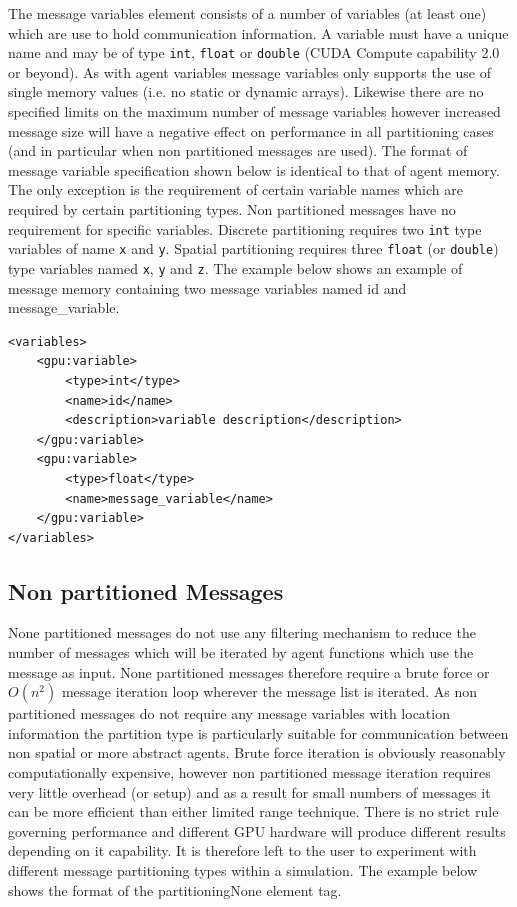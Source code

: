 \documentclass[11pt, a4paper, onecolumn, oneside]{report}
\begin{document}
The message variables element consists of a number of variables (at least one) which are use to hold communication information.
A variable must have a unique name and may be of type \texttt{int}, \texttt{float} or \texttt{double} (CUDA Compute capability 2.0 or beyond).
As with agent variables message variables only supports the use of single memory values (i.e. no static or dynamic arrays).
Likewise there are no specified limits on the maximum number of message variables however increased message size will have a negative effect on performance in all partitioning cases (and in particular when non partitioned messages are used).
The format of message variable specification shown below is identical to that of agent memory.
The only exception is the requirement of certain variable names which are required by certain partitioning types.
Non partitioned messages have no requirement for specific variables.
Discrete partitioning requires two \texttt{int} type variables of name \texttt{x} and \texttt{y}.
Spatial partitioning requires three \texttt{float} (or \texttt{double}) type variables named \texttt{x}, \texttt{y} and \texttt{z}.
The example below shows an example of message memory containing two message variables named id and message\_variable.


\begin{verbatim}
<variables>
    <gpu:variable>
        <type>int</type>
        <name>id</name>
        <description>variable description</description>
    </gpu:variable>
    <gpu:variable>
        <type>float</type>
        <name>message_variable</name>
    </gpu:variable>
</variables>
\end{verbatim}

\subsection{Non partitioned Messages}
\label{sec:242}

None partitioned messages do not use any filtering mechanism to reduce the number of messages which will be iterated by agent functions which use the message as input.
None partitioned messages therefore require a brute force or $O(n^{2})$ message iteration loop wherever the message list is iterated.
As non partitioned messages do not require any message variables with location information the partition type is particularly suitable for communication between non spatial or more abstract agents.
Brute force iteration is obviously reasonably computationally expensive, however non partitioned message iteration requires very little overhead (or setup) and as a result for small numbers of messages it can be more efficient than either limited range technique.
There is no strict rule governing performance and different GPU hardware will produce different results depending on it capability.
It is therefore left to the user to experiment with different message partitioning types within a simulation.
The example below shows the format of the partitioningNone element tag.
\end{document}
